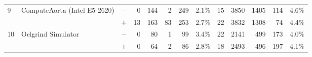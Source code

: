 \begin{tabular}{lll | rrrrr | rrrrr }
\hline
\multirow{ 2}{*}{9} & \multirow{ 2}{*}{ComputeAorta (Intel E5-2620)} & $-$ & 0 & 144 & 2 & 249 & 2.1\%       & 15 & 3850 & 1405 & 114 & 4.6\% \\& & $+$ & 13 & 163 & 83 & 253 & 2.7\% & 22 & 3832 & 1308 & 74 & 4.4\% \\
\hline
\multirow{ 2}{*}{10} & \multirow{ 2}{*}{Oclgrind Simulator} & $-$ & 0 & 80 & 1 & 99 & 3.4\%       & 22 & 2141 & 499 & 173 & 4.0\% \\& & $+$ & 0 & 64 & 2 & 86 & 2.8\% & 18 & 2493 & 496 & 197 & 4.1\% \\
  \bottomrule
\end{tabular}

